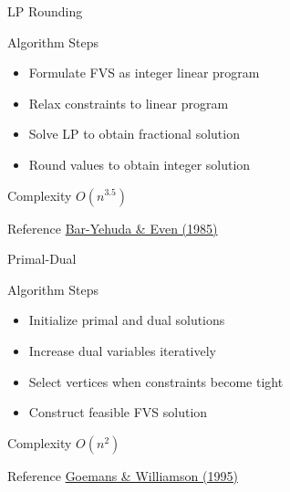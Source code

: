 \documentclass[aspectratio=169]{beamer}
\begin{document}
\begin{frame}{LP Rounding}

\begin{block}{Algorithm Steps}
\begin{itemize}
\item Formulate FVS as integer linear program
\item Relax constraints to linear program
\item Solve LP to obtain fractional solution
\item Round values to obtain integer solution
\end{itemize}
\end{block}

\begin{exampleblock}{Complexity}
$O(n^{3.5})$
\end{exampleblock}

\begin{alertblock}{Reference}
\href{https://doi.org/10.1145/227234.227238}{Bar-Yehuda \& Even (1985)}
\end{alertblock}

\end{frame}

\begin{frame}{Primal-Dual}

\begin{block}{Algorithm Steps}
\begin{itemize}
\item Initialize primal and dual solutions
\item Increase dual variables iteratively
\item Select vertices when constraints become tight
\item Construct feasible FVS solution
\end{itemize}
\end{block}

\begin{exampleblock}{Complexity}
$O(n^2)$
\end{exampleblock}

\begin{alertblock}{Reference}
  \href{https://dl.acm.org/doi/pdf/10.1145/227683.227684}{Goemans \& Williamson (1995)}
\end{alertblock}

\end{frame}

\end{document}
